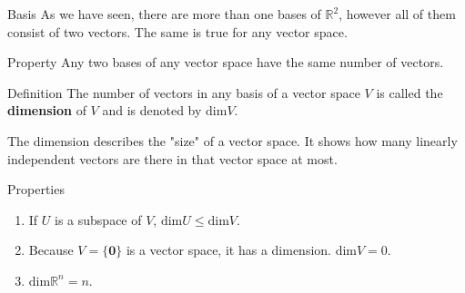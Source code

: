 \documentclass{beamer}
\newcommand{\R}{\mathbb{R}}
\begin{document}
    
\begin{frame}{Basis}
As we have seen, there are more than one bases of $\R^2$, however all of them consist of two vectors. The same is true for any vector space.\pause

\begin{block}{Property}
    Any two bases of any vector space have the same number of vectors.
\end{block}\pause
      \begin{block}{Definition}
    The number of vectors in any basis of a vector space $V$ is called the \textbf{dimension} of $V$ and is denoted by $\text{dim}V$.
  \end{block}

  The dimension describes the "size" of a vector space. It shows how many linearly independent vectors are there in that vector space at most.
  \pause
  \begin{block}{Properties}
  \begin{enumerate}[<+->]
      \item If $U$ is a subspace of $V$, $\text{dim}U\le\text{dim}V$.
      \item Because $V=\{\textbf{0}\}$ is a vector space, it has a dimension. $\text{dim}V=0$.
      \item $\text{dim}\R^n =n$.
  \end{enumerate}
     
  \end{block}


  
\end{frame}

    
\end{document}
